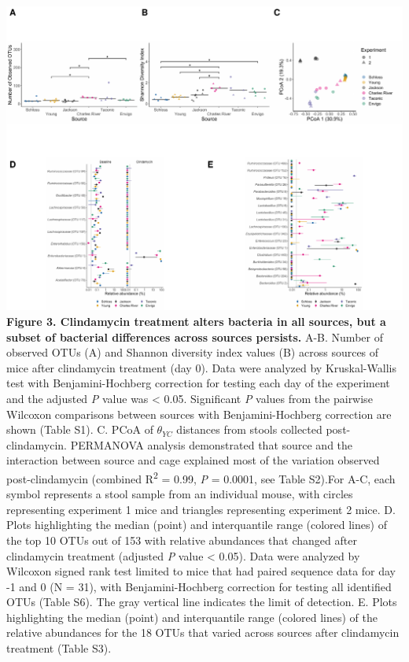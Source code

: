 \documentclass[11pt,]{article}
\begin{document}
\includegraphics{figure_3.pdf} \textbf{Figure 3. Clindamycin treatment
alters bacteria in all sources, but a subset of bacterial differences
across sources persists.} A-B. Number of observed OTUs (A) and Shannon
diversity index values (B) across sources of mice after clindamycin
treatment (day 0). Data were analyzed by Kruskal-Wallis test with
Benjamini-Hochberg correction for testing each day of the experiment and
the adjusted \emph{P} value was \textless{} 0.05. Significant \emph{P}
values from the pairwise Wilcoxon comparisons between sources with
Benjamini-Hochberg correction are shown (Table S1). C. PCoA of
\(\theta_{YC}\) distances from stools collected post-clindamycin.
PERMANOVA analysis demonstrated that source and the interaction between
source and cage explained most of the variation observed
post-clindamycin (combined R\textsuperscript{2} = 0.99, \emph{P} =
0.0001, see Table S2).For A-C, each symbol represents a stool sample
from an individual mouse, with circles representing experiment 1 mice
and triangles representing experiment 2 mice. D. Plots highlighting the
median (point) and interquantile range (colored lines) of the top 10
OTUs out of 153 with relative abundances that changed after clindamycin
treatment (adjusted \emph{P} value \textless{} 0.05). Data were analyzed
by Wilcoxon signed rank test limited to mice that had paired sequence
data for day -1 and 0 (N = 31), with Benjamini-Hochberg correction for
testing all identified OTUs (Table S6). The gray vertical line indicates
the limit of detection. E. Plots highlighting the median (point) and
interquantile range (colored lines) of the relative abundances for the
18 OTUs that varied across sources after clindamycin treatment (Table
S3).
\end{document}
